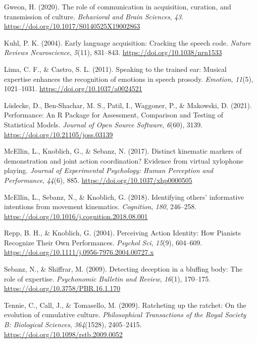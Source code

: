 \documentclass[
  man,floatsintext]{apa6}
\newlength{\cslhangindent}
\newlength{\cslentryspacingunit} %
\newenvironment{CSLReferences}[2] %
 {%
  \setlength{\parindent}{0pt}
  \ifodd #1
  \let\oldpar\par
  \def\par{\hangindent=\cslhangindent\oldpar}
  \fi
  \setlength{\parskip}{#2\cslentryspacingunit}
 }%
 {}
\begin{document}
\begin{CSLReferences}{1}{0}
\leavevmode{}%
Gweon, H. (2020). The role of communication in acquisition, curation, and transmission of culture. \emph{Behavioral and Brain Sciences}, \emph{43}. \url{https://doi.org/10.1017/S0140525X19002863}

\leavevmode{}%
Kuhl, P. K. (2004). Early language acquisition: Cracking the speech code. \emph{Nature Reviews Neuroscience}, \emph{5}(11), 831--843. \url{https://doi.org/10.1038/nrn1533}

\leavevmode{}%
Lima, C. F., \& Castro, S. L. (2011). Speaking to the trained ear: Musical expertise enhances the recognition of emotions in speech prosody. \emph{Emotion}, \emph{11}(5), 1021--1031. \url{https://doi.org/10.1037/a0024521}

\leavevmode{}%
Lüdecke, D., Ben-Shachar, M. S., Patil, I., Waggoner, P., \& Makowski, D. (2021). Performance: {An R Package} for {Assessment}, {Comparison} and {Testing} of {Statistical Models}. \emph{Journal of Open Source Software}, \emph{6}(60), 3139. \url{https://doi.org/10.21105/joss.03139}

\leavevmode{}%
McEllin, L., Knoblich, G., \& Sebanz, N. (2017). Distinct kinematic markers of demonstration and joint action coordination? {Evidence} from virtual xylophone playing. \emph{Journal of Experimental Psychology: Human Perception and Performance}, \emph{44}(6), 885. \url{https://doi.org/10.1037/xhp0000505}

\leavevmode{}%
McEllin, L., Sebanz, N., \& Knoblich, G. (2018). Identifying others' informative intentions from movement kinematics. \emph{Cognition}, \emph{180}, 246--258. \url{https://doi.org/10.1016/j.cognition.2018.08.001}

\leavevmode{}%
Repp, B. H., \& Knoblich, G. (2004). Perceiving {Action Identity}: {How Pianists Recognize Their Own Performances}. \emph{Psychol Sci}, \emph{15}(9), 604--609. \url{https://doi.org/10.1111/j.0956-7976.2004.00727.x}

\leavevmode{}%
Sebanz, N., \& Shiffrar, M. (2009). Detecting deception in a bluffing body: {The} role of expertise. \emph{Psychonomic Bulletin and Review}, \emph{16}(1), 170--175. \url{https://doi.org/10.3758/PBR.16.1.170}

\leavevmode{}%
Tennie, C., Call, J., \& Tomasello, M. (2009). Ratcheting up the ratchet: On the evolution of cumulative culture. \emph{Philosophical Transactions of the Royal Society B: Biological Sciences}, \emph{364}(1528), 2405--2415. \url{https://doi.org/10.1098/rstb.2009.0052}


\end{CSLReferences}
\end{document}
